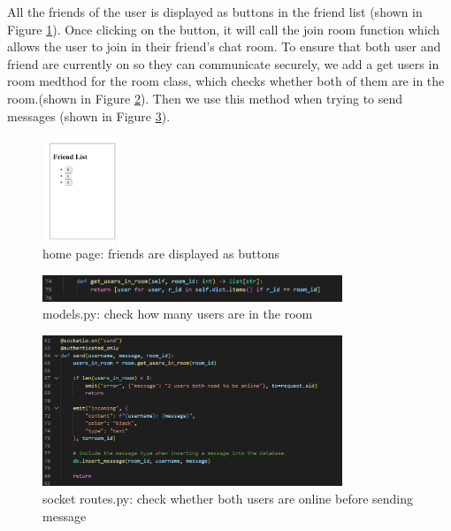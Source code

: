 \documentclass[12pt]{article}
\begin{document}
        All the friends of the user is displayed as buttons in the friend list (shown in Figure \ref{friendlist}).  Once clicking on the button, it will call the join room function which allows the user to join in their friend's chat room.  To ensure that both user and friend are currently on so they can communicate securely, we add a get users in room medthod for the room class, which checks whether both of them are in the room.(shown in Figure \ref{getusersinroom}). Then we use this method when trying to send messages (shown in Figure \ref{send}).


        \begin{figure}[H]
                \centering
                \includegraphics[width=0.2\textwidth]{zzrgraphs/friend_list.png}
                \caption{home page: friends are displayed as buttons}
                \label{friendlist}
            \end{figure}

        \begin{figure}[H]
            \centering
            \includegraphics[width=0.8\textwidth]{zzrgraphs/models_get_users_in_room.png}
            \caption{models.py: check how many users are in the room}
            \label{getusersinroom}
        \end{figure} 

        \begin{figure}[H]
            \centering
            \includegraphics[width=0.8\textwidth]{zzrgraphs/socket_send.png}
            \caption{socket routes.py: check whether both users are online before sending message}
            \label{send}
        \end{figure}  
\end{document}
